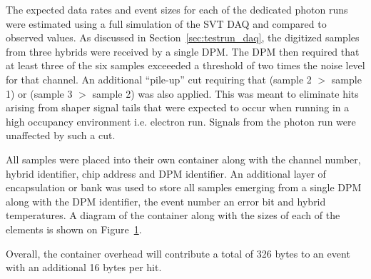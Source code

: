 
%
%

The expected data rates and event sizes for each of the dedicated photon runs
were estimated using a full simulation of the SVT DAQ and compared to observed
values. As discussed in Section~\ref{sec:testrun_daq}, the digitized samples
from three hybrids were received by a single DPM.  The DPM then required that
at least three of the six samples exceeeded a threshold of two times the noise
level for that channel.  An additional ``pile-up'' cut requiring that 
(sample 2 $>$ sample 1) or (sample 3 $>$ sample 2) was also applied. This was
meant to eliminate hits arising from shaper signal tails that were expected
to occur when running in a high occupancy environment i.e. electron run.
Signals from the photon run were unaffected by such a cut. 

All samples were placed into their own container along with the 
channel number, hybrid identifier, chip address and DPM identifier. An 
additional layer of encapsulation or bank was used to store all samples 
emerging from a single DPM along with the DPM identifier, the event number
an error bit and hybrid temperatures. A diagram of the container along with
the sizes of each of the elements is shown on Figure~\ref{fig:data_format}.
\begin{figure}[h]
    \begin{center}
        \caption{
                 } 
	\label{fig:data_format}
    \end{center}
\end{figure}
Overall, the container overhead will contribute a total of 326 bytes to an event
with an additional 16 bytes per hit.

